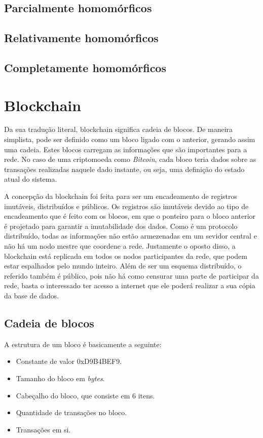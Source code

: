 \documentclass{ufsctex/ufsctex}
\begin{document}
\subsection{Parcialmente homomórficos}

\subsection{Relativamente homomórficos}

\subsection{Completamente homomórficos}


\section{Blockchain}

Da sua tradução literal, blockchain significa cadeia de blocos. De  maneira
simplista, pode ser definido como um bloco ligado com o anterior, gerando
assim uma cadeia. Estes blocos carregam as informações que são importantes para
a rede. No caso de uma criptomoeda como \textit{Bitcoin}, cada bloco teria dados sobre
as transações realizadas naquele dado instante, ou seja, uma definição do estado
atual do sistema.

A concepção da blockchain foi feita para ser um encadeamento de registros imutáveis,
distribuídos e públicos. Os registros são imutáveis devido ao tipo de encadeamento
que é feito com os blocos, em que o ponteiro para o bloco anterior é projetado para
garantir a imutabilidade dos dados. Como é um protocolo distribuído, todas as
informações não estão armezenadas em um sevidor central e não há um nodo mestre que
coordene a rede. Justamente o oposto disso, a blockchain está replicada em todos os nodos
participantes da rede, que podem estar espalhados pelo mundo inteiro. Além de ser um
esquema distribuído, o referido também é público, pois não há como censurar uma parte
de participar da rede, basta o interessado ter acesso a internet que ele poderá
realizar a sua cópia da base de dados.\cite{blockchain}

\subsection{Cadeia de blocos}

A estrutura de um bloco é basicamente a seguinte:
\begin{itemize}
	\item Constante de valor 0xD9B4BEF9.
	\item Tamanho do bloco em \textit{bytes}.
	\item Cabeçalho do bloco, que consiste em 6 itens.
	\item Quantidade de transações no bloco.
	\item Transações em si.
\end{itemize}
\end{document}
